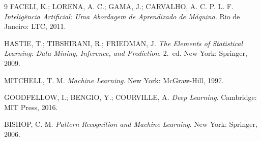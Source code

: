 \documentclass[12pt, a4paper]{article}
\theoremstyle{definition}
\theoremstyle{plain}
\theoremstyle{remark}
\begin{document}
\newpage
\begin{thebibliography}{9}
  FACELI, K.; LORENA, A. C.; GAMA, J.; CARVALHO, A. C. P. L. F\@.
  \textit{Inteligência Artificial: Uma Abordagem de Aprendizado de Máquina}.
  Rio de Janeiro: LTC, 2011.

  HASTIE, T.; TIBSHIRANI, R.; FRIEDMAN, J\@.
  \textit{The Elements of Statistical Learning: Data Mining, Inference, and Prediction}.
  2.~ed. New York: Springer, 2009.

  MITCHELL, T. M\@.
  \textit{Machine Learning}.
  New York: McGraw-Hill, 1997.

  GOODFELLOW, I.; BENGIO, Y.; COURVILLE, A\@.
  \textit{Deep Learning}.
  Cambridge: MIT Press, 2016.

  BISHOP, C. M\@.
  \textit{Pattern Recognition and Machine Learning}.
  New York: Springer, 2006.
\end{thebibliography}
\end{document}
